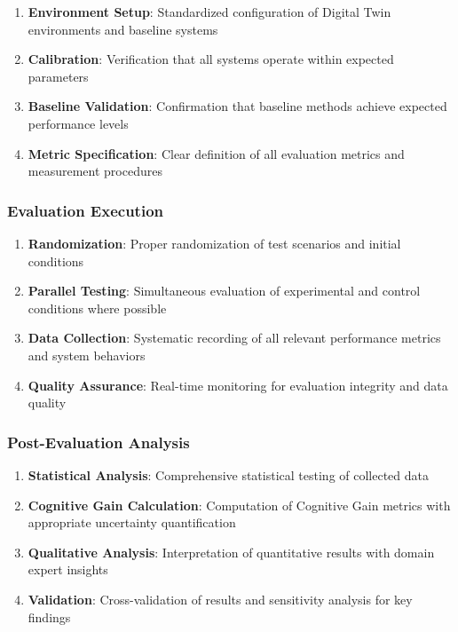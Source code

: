 \begin{enumerate}
\item \textbf{Environment Setup}: Standardized configuration of Digital Twin environments and baseline systems
\item \textbf{Calibration}: Verification that all systems operate within expected parameters
\item \textbf{Baseline Validation}: Confirmation that baseline methods achieve expected performance levels
\item \textbf{Metric Specification}: Clear definition of all evaluation metrics and measurement procedures
\end{enumerate}

\subsubsection{Evaluation Execution}

\begin{enumerate}
\item \textbf{Randomization}: Proper randomization of test scenarios and initial conditions
\item \textbf{Parallel Testing}: Simultaneous evaluation of experimental and control conditions where possible
\item \textbf{Data Collection}: Systematic recording of all relevant performance metrics and system behaviors
\item \textbf{Quality Assurance}: Real-time monitoring for evaluation integrity and data quality
\end{enumerate}

\subsubsection{Post-Evaluation Analysis}

\begin{enumerate}
\item \textbf{Statistical Analysis}: Comprehensive statistical testing of collected data
\item \textbf{Cognitive Gain Calculation}: Computation of Cognitive Gain metrics with appropriate uncertainty quantification
\item \textbf{Qualitative Analysis}: Interpretation of quantitative results with domain expert insights
\item \textbf{Validation}: Cross-validation of results and sensitivity analysis for key findings
\end{enumerate}

